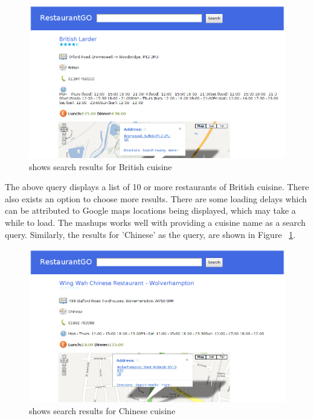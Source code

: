 \begin{figure}[!htb]
  \centering
  \includegraphics[width=16cm]{fig/restaurant_go_results_british.png}
  \caption[ RestaurantGo search results for  British cuisine]
  {shows search results for British cuisine}
\end{figure}


The above query displays a list of 10 or more restaurants of British cuisine. There also exists an option to choose more results. There are some loading delays which can be attributed to Google maps locations being displayed, which may take a while to load.
The mashups works well with providing a cuisine name as a search query. Similarly, the results for 'Chinese' as the query, are shown in Figure ~\ref{fig:4.2}.

\begin{figure}[!htb]
  \centering
  \includegraphics[width=16cm]{fig/restaurant_go_results_chinese.png}
  \caption[ RestaurantGo search results for Chinese cuisine]
  {shows search results for Chinese cuisine}
  \label{fig:4.2}
\end{figure}


